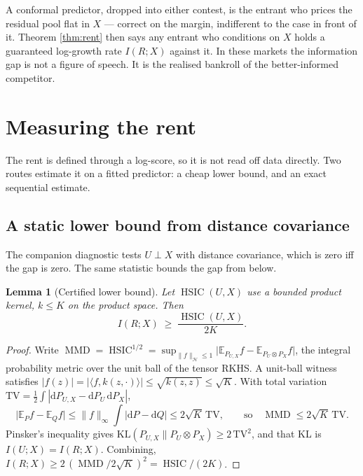 \documentclass[11pt]{article}
\newtheorem{lemma}{Lemma}
\begin{document}
A conformal predictor, dropped into either contest, is the entrant who prices the residual pool flat
in $X$ --- correct on the margin, indifferent to the case in front of it. Theorem \ref{thm:rent}
then says any entrant who conditions on $X$ holds a guaranteed log-growth rate $I(R;X)$ against it.
In these markets the information gap is not a figure of speech. It is the realised bankroll of the
better-informed competitor.

\section{Measuring the rent}

The rent is defined through a log-score, so it is not read off data directly. Two routes estimate
it on a fitted predictor: a cheap lower bound, and an exact sequential estimate.

\subsection{A static lower bound from distance covariance}

The companion diagnostic \citep{cotton_signed} tests $U\perp X$ with distance covariance, which is
zero iff the gap is zero. The same statistic bounds the gap from below.

\begin{lemma}[Certified lower bound]\label{lem:lower}
Let $\operatorname{HSIC}(U,X)$ use a bounded product kernel, $k\le K$ on the product space. Then
\begin{equation}
I(R;X)\;\ge\;\frac{\operatorname{HSIC}(U,X)}{2K}.
\end{equation}
\end{lemma}

\begin{proof}
Write $\operatorname{MMD}=\operatorname{HSIC}^{1/2}=\sup_{\|f\|_{\mathcal H}\le 1}\big|\mathbb
E_{P_{U,X}}f-\mathbb E_{P_U\otimes P_X}f\big|$, the integral probability metric over the unit ball
of the tensor RKHS. A unit-ball witness satisfies $|f(z)|=|\langle f,k(z,\cdot)\rangle|\le
\sqrt{k(z,z)}\le\sqrt K$. With total variation $\mathrm{TV}=\tfrac12\int|\mathrm dP_{U,X}-\mathrm
dP_U\,\mathrm dP_X|$,
\[
\big|\mathbb E_{P}f-\mathbb E_{Q}f\big|\le\|f\|_\infty\!\int|\mathrm dP-\mathrm dQ|\le 2\sqrt K\,
\mathrm{TV},\qquad\text{so}\quad \operatorname{MMD}\le 2\sqrt K\,\mathrm{TV}.
\]
Pinsker's inequality \citep{cover2006} gives $\mathrm{KL}(P_{U,X}\|P_U\otimes P_X)\ge 2\,
\mathrm{TV}^2$, and that KL is $I(U;X)=I(R;X)$. Combining,
$I(R;X)\ge 2\,(\operatorname{MMD}/2\sqrt K)^2=\operatorname{HSIC}/(2K)$.
\end{proof}
\end{document}
